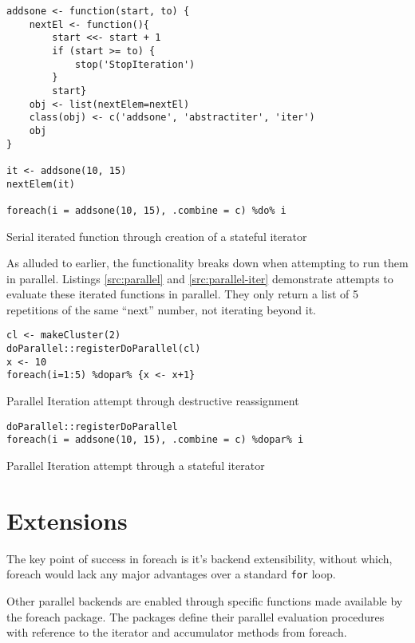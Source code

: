 \documentclass[a4paper,10pt]{article}
\begin{document}
\begin{listing}
\begin{verbatim}
addsone <- function(start, to) {
	nextEl <- function(){
		start <<- start + 1
		if (start >= to) {
			stop('StopIteration')
		}
		start}
	obj <- list(nextElem=nextEl)
	class(obj) <- c('addsone', 'abstractiter', 'iter')
	obj
}

it <- addsone(10, 15)
nextElem(it)

foreach(i = addsone(10, 15), .combine = c) %do% i
\end{verbatim}
\caption{Serial iterated function through creation of a stateful iterator}\label{src:serial-iter}
\end{listing}

As alluded to earlier, the functionality breaks down when attempting to run
them in parallel.
Listings \ref{src:parallel} and \ref{src:parallel-iter} demonstrate attempts to
evaluate these iterated functions in parallel.
They only return a list of 5 repetitions of the same ``next'' number, not
iterating beyond it.

\begin{listing}
\begin{verbatim}
cl <- makeCluster(2)
doParallel::registerDoParallel(cl)
x <- 10
foreach(i=1:5) %dopar% {x <- x+1}
\end{verbatim}
\caption{Parallel Iteration attempt through destructive reassignment}\label{src:parallel}
\end{listing}

\begin{listing}
\begin{verbatim}
doParallel::registerDoParallel
foreach(i = addsone(10, 15), .combine = c) %dopar% i
\end{verbatim}
\caption{Parallel Iteration attempt through a stateful iterator}\label{src:parallel-iter}
\end{listing}

\section{Extensions}
\label{sec:extensions}

The key point of success in foreach is it's backend extensibility,
without which, foreach would lack any major advantages over a standard
\texttt{for} loop.

Other parallel backends are enabled through specific functions made
available by the foreach package. The packages define their parallel
evaluation procedures with reference to the iterator and accumulator
methods from foreach.
\end{document}

